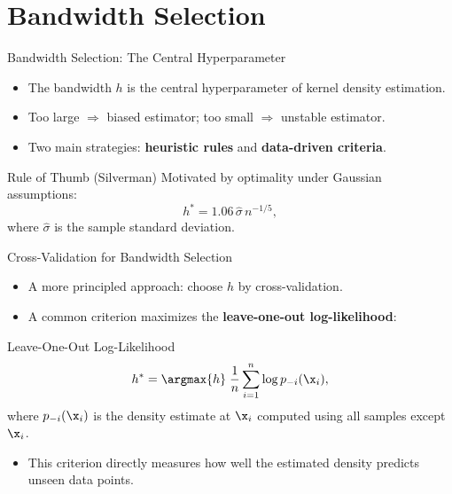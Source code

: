 \section{Bandwidth Selection}

\begin{frame}{Bandwidth Selection: The Central Hyperparameter}
  \begin{itemize}
    \item The bandwidth $h$ is the \alert{central hyperparameter} of kernel density estimation.
    \item Too large $\Rightarrow$ biased estimator; too small $\Rightarrow$ unstable estimator.
    \item Two main strategies: \textbf{heuristic rules} and \textbf{data-driven criteria}.
  \end{itemize}
  \vspace{0.5em}
  \begin{block}{Rule of Thumb (Silverman)}
    Motivated by optimality under Gaussian assumptions:
    \[
      h^* = 1.06\,\hat{\sigma}\,n^{-1/5},
    \]
    where $\hat{\sigma}$ is the sample standard deviation.
  \end{block}
\end{frame}

\begin{frame}{Cross-Validation for Bandwidth Selection}
  \begin{itemize}
    \item A more principled approach: choose $h$ by \alert{cross-validation}.
    \item A common criterion maximizes the \textbf{leave-one-out log-likelihood}:
  \end{itemize}
  \begin{block}{Leave-One-Out Log-Likelihood}
    \[
      h^* = \argmax{h}\; \frac{1}{n}\sum_{i=1}^{n} \log p_{-i}(\x_i),
    \]
    where $p_{-i}(\x_i)$ is the density estimate at $\x_i$ computed using all samples except $\x_i$.
  \end{block}
  \vspace{0.3em}
  \begin{itemize}
    \item This criterion directly measures how well the estimated density \alert{predicts unseen data points}.
  \end{itemize}
\end{frame}

